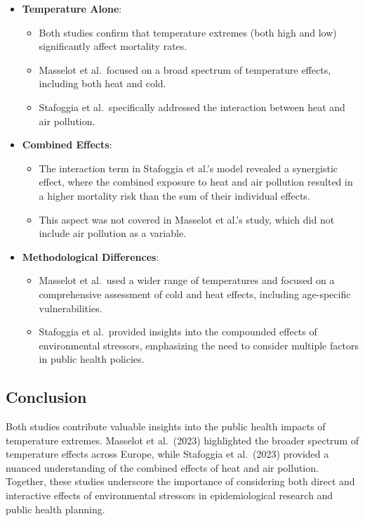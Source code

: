 \documentclass[
]{krantz}
\providecommand{\tightlist}{%
  \setlength{\itemsep}{0pt}\setlength{\parskip}{0pt}}
\begin{document}
\begin{itemize}
\tightlist
\item
  \textbf{Temperature Alone}:

  \begin{itemize}
  \tightlist
  \item
    Both studies confirm that temperature extremes (both high and low) significantly affect mortality rates.
  \item
    Masselot et al.~focused on a broad spectrum of temperature effects, including both heat and cold.
  \item
    Stafoggia et al.~specifically addressed the interaction between heat and air pollution.
  \end{itemize}
\item
  \textbf{Combined Effects}:

  \begin{itemize}
  \tightlist
  \item
    The interaction term in Stafoggia et al.'s model revealed a synergistic effect, where the combined exposure to heat and air pollution resulted in a higher mortality risk than the sum of their individual effects.
  \item
    This aspect was not covered in Masselot et al.'s study, which did not include air pollution as a variable.
  \end{itemize}
\item
  \textbf{Methodological Differences}:

  \begin{itemize}
  \tightlist
  \item
    Masselot et al.~used a wider range of temperatures and focused on a comprehensive assessment of cold and heat effects, including age-specific vulnerabilities.
  \item
    Stafoggia et al.~provided insights into the compounded effects of environmental stressors, emphasizing the need to consider multiple factors in public health policies.
  \end{itemize}
\end{itemize}

\subsection{Conclusion}\label{conclusion-6}

Both studies contribute valuable insights into the public health impacts of temperature extremes. Masselot et al.~(2023) \citep{masselot2023} highlighted the broader spectrum of temperature effects across Europe, while Stafoggia et al.~(2023) \citep{stafoggia2023} provided a nuanced understanding of the combined effects of heat and air pollution. Together, these studies underscore the importance of considering both direct and interactive effects of environmental stressors in epidemiological research and public health planning.
\end{document}

